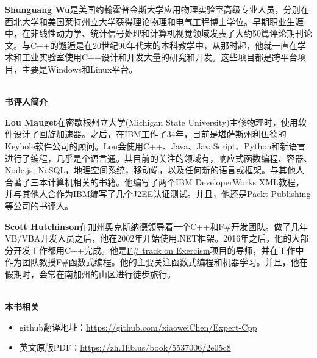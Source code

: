 \documentclass[11pt,a4paper,UTF8]{ctexart}
\begin{document}
	\textbf{Shunguang Wu}是美国约翰霍普金斯大学应用物理实验室高级专业人员，分别在西北大学和美国莱特州立大学获得理论物理和电气工程博士学位。早期职业生涯中，在非线性动力学、统计信号处理和计算机视觉领域发表了大约50篇评论期刊论文。与C++的邂逅是在20世纪90年代末的本科教学中，从那时起，他就一直在学术和工业实验室使用C++设计和开发大量的研究和开发。这些项目都是跨平台项目，主要是Windows和Linux平台。\par
	
	\hspace*{\fill} \\ %
	\noindent\textbf{书评人简介}\ \par
	\textbf{Lou Mauget}在密歇根州立大学(Michigan State University)主修物理时，使用软件设计了回旋加速器。之后，在IBM工作了34年，目前是堪萨斯州利伍德的Keyhole软件公司的顾问。Lou会使用C++、Java、JavaScript、Python和新语言进行了编程，几乎是个语言通。其目前的关注的领域有，响应式函数编程、容器、Node.js, NoSQL，地理空间系统，移动端，以及任何新的语言或框架。与其他人合著了三本计算机相关的书籍。他编写了两个IBM DeveloperWorks XML教程，并与其他人合作为IBM编写了几个J2EE认证测试。并且，他还是Packt Publishing等公司的书评人。 \par
	
	\textbf{Scott Hutchinson}在加州奥克斯纳德领导着一个C++和F\#开发团队。做了几年VB/VBA开发人员之后，他在2002年开始使用.NET框架。2016年之后，他的大部分开发工作都用C++完成。他是\href{https://github.com/exercism/fsharp}{F\# track on Exercism}项目的导师，并在工作中作为团队教授F\#函数式编程。他的主要关注函数式编程和机器学习。并且，他在假期时，会常在南加州的山区进行徒步旅行。 \par
	
	\hspace*{\fill} \\ %
	\noindent\textbf{本书相关}\ \par
	\begin{itemize}
		\item github翻译地址：\href{https://github.com/xiaoweiChen/Expert-Cpp}{https://github.com/xiaoweiChen/Expert-Cpp}
		\item 英文原版PDF：\href{https://zh.1lib.us/book/5537006/2e05c8}{https://zh.1lib.us/book/5537006/2e05c8}
	\end{itemize}
	\newpage
	
	\tableofcontents
	\newpage
	
	\pagestyle{empty}
	
	\newpage
	
	\pagestyle{empty}
	
	\newpage
	
\end{document}
